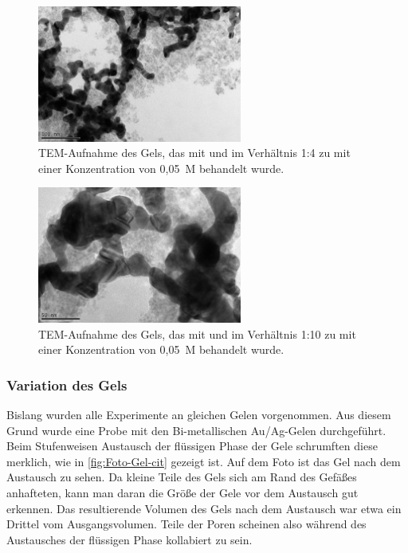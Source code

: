 		\begin{figure}[H]
			\centering
			\includegraphics[width=0.6\textwidth]{Bilder/Gel-E-CdCl-1-4-0,05} 	
			\caption{TEM-Aufnahme des Gels, das mit  und  im Verhältnis 1:4  zu  mit einer Konzentration von 0,05~M behandelt wurde.}
			\label{fig:Gel-E-CdCl-1-4-0-05}
		\end{figure}
	
		\begin{figure}[H]
			\centering
			\includegraphics[width=0.6\textwidth]{Bilder/Gel-E-CdCl-1-10-0,05} 	
			\caption{TEM-Aufnahme des Gels, das mit  und  im Verhältnis 1:10  zu  mit einer Konzentration von 0,05~M behandelt wurde.}
			\label{fig:Gel-E-CdCl-1-10-0-05}
		\end{figure}
		
	\subsubsection{Variation des Gels}
		Bislang wurden alle Experimente an gleichen Gelen vorgenommen.
		Aus diesem Grund wurde eine Probe mit den Bi-metallischen Au/Ag-Gelen durchgeführt.
		Beim Stufenweisen Austausch der flüssigen Phase der Gele schrumften diese merklich, wie in \cref{fig:Foto-Gel-cit} gezeigt ist.
		Auf dem Foto ist das Gel nach dem Austausch zu sehen. 
		Da kleine Teile des Gels sich am Rand des Gefäßes anhafteten,  kann man daran die Größe der Gele vor dem Austausch gut erkennen. 
		Das resultierende Volumen des Gels nach dem Austausch war etwa ein Drittel vom Ausgangsvolumen.
		Teile der Poren scheinen also während des Austausches der flüssigen Phase kollabiert zu sein.
		
